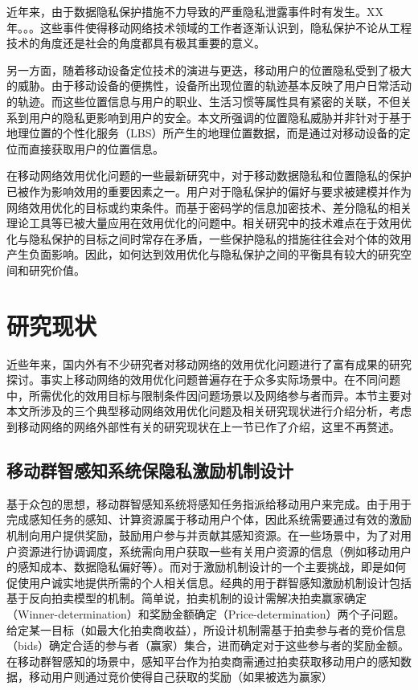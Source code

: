 近年来，由于数据隐私保护措施不力导致的严重隐私泄露事件时有发生。XX年。。。这些事件使得移动网络技术领域的工作者逐渐认识到，隐私保护不论从工程技术的角度还是社会的角度都具有极其重要的意义。



另一方面，随着移动设备定位技术的演进与更迭，移动用户的位置隐私受到了极大的威胁。由于移动设备的便携性，设备所出现位置的轨迹基本反映了用户日常活动的轨迹。而这些位置信息与用户的职业、生活习惯等属性具有紧密的关联，不但关系到用户的隐私更影响到用户的安全。本文所强调的位置隐私威胁并非针对于基于地理位置的个性化服务（LBS）所产生的地理位置数据，而是通过对移动设备的定位而直接获取用户的位置信息。

在移动网络效用优化问题的一些最新研究中，对于移动数据隐私和位置隐私的保护已被作为影响效用的重要因素之一。用户对于隐私保护的偏好与要求被建模并作为网络效用优化的目标或约束条件。而基于密码学的信息加密技术、差分隐私\cite{}的相关理论工具等已被大量应用在效用优化的问题中。相关研究中的技术难点在于效用优化与隐私保护的目标之间时常存在矛盾，一些保护隐私的措施往往会对个体的效用产生负面影响。因此，如何达到效用优化与隐私保护之间的平衡具有较大的研究空间和研究价值。


\fi

\section{研究现状}

近些年来，国内外有不少研究者对移动网络的效用优化问题进行了富有成果的研究探讨。事实上移动网络的效用优化问题普遍存在于众多实际场景中。在不同问题中，所需优化的效用目标与限制条件因问题场景以及网络参与者而异。本节主要对本文所涉及的三个典型移动网络效用优化问题及相关研究现状进行介绍分析，考虑到移动网络的网络外部性有关的研究现状在上一节已作了介绍，这里不再赘述。

\subsection{移动群智感知系统保隐私激励机制设计}

基于众包的思想，移动群智感知系统将感知任务指派给移动用户来完成。由于用于完成感知任务的感知、计算资源属于移动用户个体，因此系统需要通过有效的激励机制向用户提供奖励，鼓励用户参与并贡献其感知资源。在一些场景中，为了对用户资源进行协调调度，系统需向用户获取一些有关用户资源的信息（例如移动用户的感知成本、数据隐私偏好等）。而对于激励机制设计的一个主要挑战，即是如何促使用户诚实地提供所需的个人相关信息。经典的用于群智感知激励机制设计包括基于反向拍卖模型的机制\cite{yang2012crowdsourcing}。简单说，拍卖机制的设计需解决拍卖赢家确定（Winner-determination）和奖励金额确定（Price-determination）两个子问题。给定某一目标（如最大化拍卖商收益），所设计机制需基于拍卖参与者的竞价信息（bids）确定合适的参与者（赢家）集合，进而确定对于这些参与者的奖励金额。在移动群智感知的场景中，感知平台作为拍卖商需通过拍卖获取移动用户的感知数据，移动用户则通过竞价使得自己获取的奖励（如果被选为赢家）

